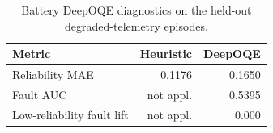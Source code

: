 \begin{table}[ht]
\centering
\caption{Battery DeepOQE diagnostics on the held-out degraded-telemetry episodes.}
\label{tab:battery-deep-oqe-summary}
\begin{tabular}{lrr}
\toprule
Metric & Heuristic & DeepOQE \\
\midrule
Reliability MAE & 0.1176 & 0.1650 \\
Fault AUC & not appl. & 0.5395 \\
Low-reliability fault lift & not appl. & 0.000 \\
\bottomrule
\end{tabular}
\end{table}
